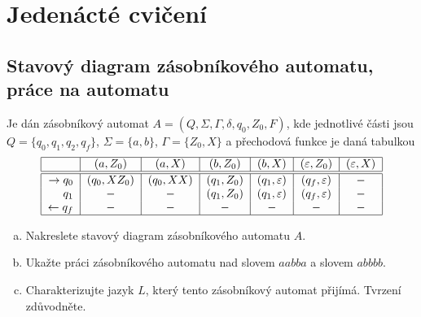 \section{Jedenácté cvičení}

\subsection{Stavový diagram zásobníkového automatu, práce na automatu}
Je dán zásobníkový automat $A = (Q, \Sigma, \Gamma, \delta, q_0, Z_0, F)$, kde jednotlivé části jsou 
$Q = \{q_0, q_1, q_2, q_f\}$, $\Sigma = \{a, b\}$, $\Gamma =\{Z_0, X\}$ a přechodová funkce je daná tabulkou
\[
\begin{tabular}{|r|c|c|c|c|c|c|}
    \hline
    & $(a, Z_0)$ & $(a, X)$ & $(b, Z_0)$ & $(b, X)$ & $(\varepsilon, Z_0)$ & $(\varepsilon, X)$\\
    \hline
    \hline
    $\rightarrow q_0$& $(q_0, X Z_0)$ & $(q_0, XX)$ & $(q_1, Z_0)$ & $(q_1, \varepsilon)$ & $(q_f, \varepsilon)$ & $-$\\
    $q_1$            & $-$            & $-$         & $(q_1, Z_0)$ & $(q_1, \varepsilon)$ & $(q_f, \varepsilon)$ & $-$\\
    $\leftarrow q_f$ & $-$& $-$& $-$ & $-$ & $-$ & $-$\\
    \hline
\end{tabular}
\]

\begin{enumerate}[a), noitemsep]
    \item Nakreslete stavový diagram zásobníkového automatu $A$.
    \item Ukažte práci zásobníkového automatu nad slovem $aabba$ a slovem $abbbb$.
    \item Charakterizujte jazyk $L$, který tento zásobníkový automat přijímá. Tvrzení zdůvodněte.
\end{enumerate}

